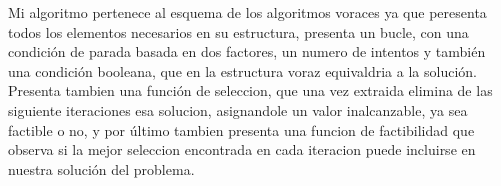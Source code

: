 Mi algoritmo pertenece al esquema de los algoritmos voraces ya que peresenta
todos los elementos necesarios en su estructura, presenta un bucle, con una
condición de parada basada en dos factores, un numero de intentos y también una
condición booleana, que en la estructura voraz equivaldria a la solución.
Presenta tambien una función de seleccion, que una vez extraida elimina de las
siguiente iteraciones esa solucion, asignandole un valor inalcanzable, ya sea
factible o no, y por último tambien presenta una funcion de factibilidad que
observa si la mejor seleccion encontrada en cada iteracion puede incluirse en
nuestra solución del problema.
